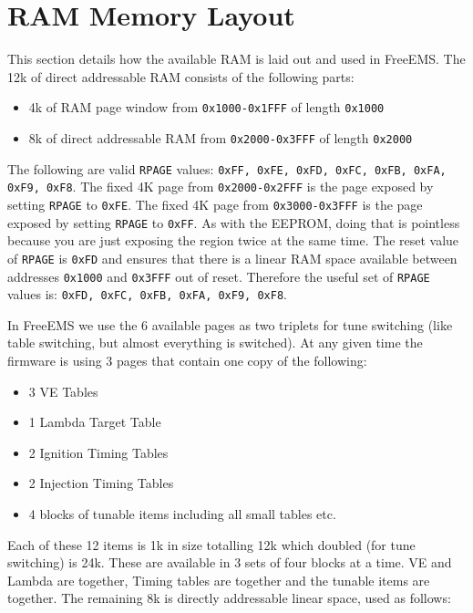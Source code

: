 \documentclass[12pt,a4wide,titlepage]{article}
\begin{document}
\section{RAM Memory Layout}

This section details how the available RAM is laid out and used in FreeEMS.
The 12k of direct addressable RAM consists of the following parts:

\begin{itemize}
\item 4k of RAM page window from \texttt{0x1000-0x1FFF} of length \texttt{0x1000}
\item 8k of direct addressable RAM from \texttt{0x2000-0x3FFF} of length \texttt{0x2000}
\end{itemize}

The following are valid \texttt{RPAGE} values: \texttt{0xFF, 0xFE, 0xFD, 0xFC,
0xFB, 0xFA, 0xF9, 0xF8}. The fixed 4K page from \texttt{0x2000-0x2FFF} is the
page exposed by setting \texttt{RPAGE} to \texttt{0xFE}. The fixed 4K page
from \texttt{0x3000-0x3FFF} is the page exposed by setting \texttt{RPAGE} to
\texttt{0xFF}. As with the EEPROM, doing that is pointless because you are just
exposing the region twice at the same time. The reset value of \texttt{RPAGE}
is \texttt{0xFD} and ensures that there is a linear RAM space available between
addresses \texttt{0x1000} and \texttt{0x3FFF} out of reset. Therefore the
useful set of \texttt{RPAGE} values is: \texttt{0xFD, 0xFC, 0xFB, 0xFA, 0xF9,
0xF8}.

In FreeEMS we use the 6 available pages as two triplets for tune switching
(like table switching, but almost everything is switched). At any given time
the firmware is using 3 pages that contain one copy of the following:

\begin{itemize}
\item 3 VE Tables
\item 1 Lambda Target Table
\item 2 Ignition Timing Tables
\item 2 Injection Timing Tables
\item 4 blocks of tunable items including all small tables etc.
\end{itemize}

Each of these 12 items is 1k in size totalling 12k which doubled (for tune
switching) is 24k. These are available in 3 sets of four blocks at a time.
VE and Lambda are together, Timing tables are together and the tunable items
are together. The remaining 8k is directly addressable linear space, used as
follows:
\end{document}
